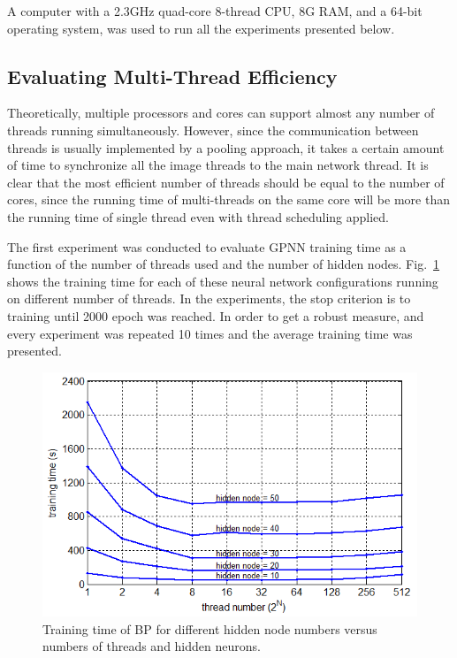 \documentclass[procedia]{easychair}
\begin{document}
A computer with a 2.3GHz quad-core 8-thread CPU, 8G RAM, and a 64-bit operating system, was used to run all the experiments presented below.

\subsection{Evaluating Multi-Thread Efficiency}

Theoretically, multiple processors and cores can support almost any number of threads running simultaneously.  However, since the communication between threads is usually implemented by a pooling approach, it takes a certain amount of time to synchronize all the image threads to the main network thread.  It is clear that the most efficient number of threads should be equal to the number of cores, since the running time of multi-threads on the same core will be more than the running time of single thread even with thread scheduling applied.

The first experiment was conducted to evaluate GPNN training time as a function of the number of threads used and the number of hidden nodes.  Fig.~\ref{fig:thread_efficiency} shows the training time for each of these neural network configurations running on different number of threads.  In the experiments, the stop criterion is to training until 2000 epoch was reached.  In order to get a robust measure, and every experiment was repeated 10 times and the average training time was presented.

\begin{figure}[tb]
    \centering
    \includegraphics[scale=0.6]{../pic/efficiency.png}
    \caption{Training time of BP for different hidden node numbers versus numbers of threads and hidden neurons.}
    \label{fig:thread_efficiency}
\end{figure}
\end{document}
